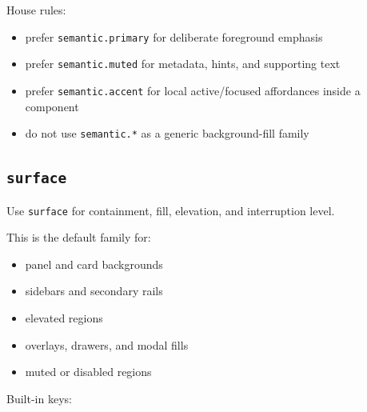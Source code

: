 House rules:

\begin{itemize}
\tightlist
\item
  prefer \texttt{s\allowbreak{}e\allowbreak{}m\allowbreak{}a\allowbreak{}n\allowbreak{}t\allowbreak{}i\allowbreak{}c\allowbreak{}.\allowbreak{}p\allowbreak{}r\allowbreak{}i\allowbreak{}m\allowbreak{}a\allowbreak{}r\allowbreak{}y} for deliberate foreground emphasis
\item
  prefer \texttt{s\allowbreak{}e\allowbreak{}m\allowbreak{}a\allowbreak{}n\allowbreak{}t\allowbreak{}i\allowbreak{}c\allowbreak{}.\allowbreak{}m\allowbreak{}u\allowbreak{}t\allowbreak{}e\allowbreak{}d} for metadata, hints, and supporting text
\item
  prefer \texttt{s\allowbreak{}e\allowbreak{}m\allowbreak{}a\allowbreak{}n\allowbreak{}t\allowbreak{}i\allowbreak{}c\allowbreak{}.\allowbreak{}a\allowbreak{}c\allowbreak{}c\allowbreak{}e\allowbreak{}n\allowbreak{}t} for local active/focused affordances inside a component
\item
  do not use \texttt{s\allowbreak{}e\allowbreak{}m\allowbreak{}a\allowbreak{}n\allowbreak{}t\allowbreak{}i\allowbreak{}c\allowbreak{}.\allowbreak{}*} as a generic background-fill family
\end{itemize}

\subsection{\texorpdfstring{\texttt{s\allowbreak{}u\allowbreak{}r\allowbreak{}f\allowbreak{}a\allowbreak{}c\allowbreak{}e}}{}}\label{record-028-surface}

Use \texttt{s\allowbreak{}u\allowbreak{}r\allowbreak{}f\allowbreak{}a\allowbreak{}c\allowbreak{}e} for containment, fill, elevation, and interruption level.

This is the default family for:

\begin{itemize}
\tightlist
\item
  panel and card backgrounds
\item
  sidebars and secondary rails
\item
  elevated regions
\item
  overlays, drawers, and modal fills
\item
  muted or disabled regions
\end{itemize}

Built-in keys:

